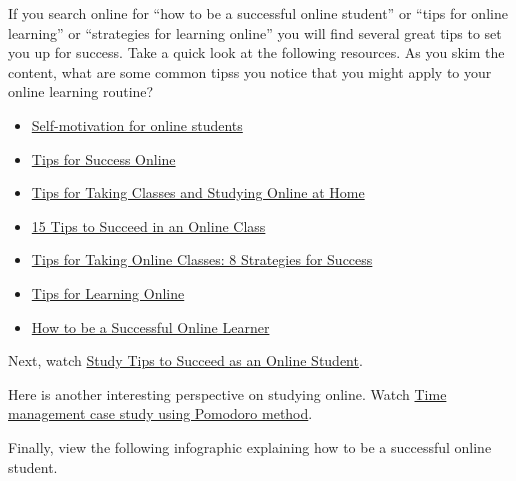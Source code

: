 \documentclass[
]{book}
\providecommand{\tightlist}{%
  \setlength{\itemsep}{0pt}\setlength{\parskip}{0pt}}
\theoremstyle{definition}
\theoremstyle{definition}
\theoremstyle{definition}
\theoremstyle{definition}
\theoremstyle{remark}
\begin{document}
\begin{reflect}
If you search online for ``how to be a successful online student'' or ``tips for online learning'' or ``strategies for learning online'' you will find several great tips to set you up for success. Take a quick look at the following resources. As you skim the content, what are some common tipss you notice that you might apply to your online learning routine?

\begin{itemize}
\tightlist
\item
  \href{https://www.purdueglobal.edu/blog/online-learning/online-learning-self-motivation/}{Self-motivation for online students}\\
\item
  \href{https://www.unlv.edu/online/tips}{Tips for Success Online}\\
\item
  \href{https://www.ualberta.ca/current-students/academic-success-centre/resources/working-online.html}{Tips for Taking Classes and Studying Online at Home}\\
\item
  \href{https://online.umn.edu/story/15-tips-succeed-online-class}{15 Tips to Succeed in an Online Class}\\
\item
  \href{https://graduate.northeastern.edu/resources/tips-for-taking-online-classes/}{Tips for Taking Online Classes: 8 Strategies for Success}\\
\item
  \href{https://scpd.stanford.edu/tips-learning-online}{Tips for Learning Online}\\
\item
  \href{https://www.trentu.ca/online/student-support/be-a-successful-online-learner}{How to be a Successful Online Learner}
\end{itemize}

Next, watch \href{https://www.youtube.com/watch?v=-1DRETk-mns}{Study Tips to Succeed as an Online Student}.

Here is another interesting perspective on studying online. Watch \href{https://www.youtube.com/watch?v=z7e7gtU3PHY}{Time management case study using Pomodoro method}.

Finally, view the following infographic explaining how to be a successful online student.


\end{reflect}
\end{document}

